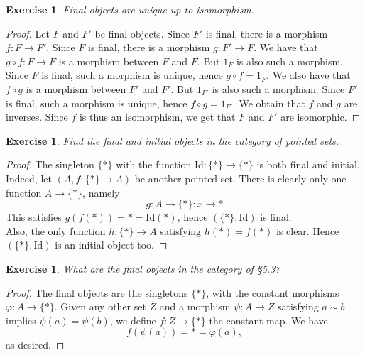 \documentclass[a4paper, 11pt]{book}
\theoremstyle{plain}
\newtheorem{exercise}[theorem]{Exercise}
\theoremstyle{plain}
\begin{document}
\begin{exercise}
Final objects are unique up to isomorphism.
\end{exercise}
\begin{proof}
Let $F$ and $F'$ be final objects. Since $F'$ is final, there is a morphism $f:F\rightarrow F'$. Since $F$ is final, there is a morphism $g:F'\rightarrow F$. We have that $g\circ f:F\rightarrow F$ is a morphism between $F$ and $F$. But $1_F$ is also such a morphism. Since $F$ is final, such a morphism is unique, hence $g\circ f=1_F$. We also have that $f\circ g$ is a morphism between $F'$ and $F'$. But $1_{F'}$ is also such a morphism. Since $F'$ is final, such a morphism is unique, hence $f\circ g=1_{F'}$. We obtain that $f$ and $g$ are inverses. Since $f$ is thus an isomorphism, we get that $F$ and $F'$ are isomorphic.
\end{proof}

\begin{exercise}
Find the final and initial objects in the category of pointed sets.
\end{exercise}
\begin{proof}
The singleton $\{*\}$ with the function $\text{Id}:\{*\}\rightarrow \{*\}$ is both final and initial. Indeed, let $(A,f:\{*\}\rightarrow A)$ be another pointed set. There is clearly only one function $A\rightarrow \{*\}$, namely
$$g:A\rightarrow \{*\}:x\rightarrow *$$
This satisfies $g(f(*)) = * = \text{Id}(*)$, hence $(\{*\}, \text{Id})$ is final.\\
Also, the only function $h:\{*\}\rightarrow A$ satisfying $h(*) = f(*)$ is clear. Hence $(\{*\}, \text{Id})$ is an initial object too.
\end{proof}

\begin{exercise}
What are the final objects in the category of \S 5.3?
\end{exercise}
\begin{proof}
The final objects are the singletons $\{*\}$, with the constant morphisms $\varphi: A\rightarrow \{*\}$. Given any other set $Z$ and a morphism $\psi:A\rightarrow Z$ satisfying $a\sim b$ implies $\psi(a) = \psi(b)$, we define $f:Z\rightarrow \{*\}$ the constant map. We have $$f(\psi(a)) = * = \varphi(a),$$
as desired.
\end{proof}
\end{document}

